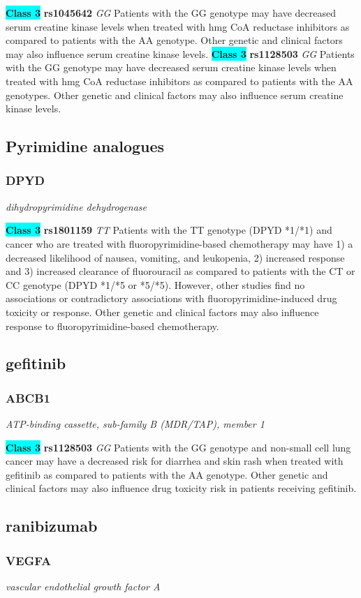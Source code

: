 \documentclass{report}
\begin{document}
\textbf{\colorbox{cyan} {Class 3}} \textbf{ rs1045642 } \textit{ GG }
Patients with the GG genotype may have decreased serum creatine kinase levels when treated with hmg CoA reductase inhibitors as compared to patients with the AA genotype. Other genetic and clinical factors may also influence serum creatine kinase levels. \newline\textbf{\colorbox{cyan} {Class 3}} \textbf{ rs1128503 } \textit{ GG }
Patients with the GG genotype may have decreased serum creatine kinase levels when treated with hmg CoA reductase inhibitors as compared to patients with the AA genotypes. Other genetic and clinical factors may also influence serum creatine kinase levels. \newline\subsection{ Pyrimidine analogues }\subsubsection{ DPYD }
\textit{ dihydropyrimidine dehydrogenase }

\textbf{\colorbox{cyan} {Class 3}} \textbf{ rs1801159 } \textit{ TT }
Patients with the TT genotype (DPYD *1/*1) and cancer who are treated with fluoropyrimidine-based chemotherapy may have 1) a decreased likelihood of nausea, vomiting, and leukopenia, 2) increased response and 3) increased clearance of fluorouracil as compared to patients with the CT or CC genotype (DPYD *1/*5 or *5/*5). However, other studies find no associations or contradictory associations with fluoropyrimidine-induced drug toxicity or response. Other genetic and clinical factors may also influence response to fluoropyrimidine-based chemotherapy.\newline\subsection{ gefitinib }\subsubsection{ ABCB1 }
\textit{ ATP-binding cassette, sub-family B (MDR/TAP), member 1 }

\textbf{\colorbox{cyan} {Class 3}} \textbf{ rs1128503 } \textit{ GG }
Patients with the GG genotype and non-small cell lung cancer may have a decreased risk for diarrhea and skin rash when treated with gefitinib as compared to patients with the AA genotype. Other genetic and clinical factors may also influence drug toxicity risk in patients receiving gefitinib.\newline\subsection{ ranibizumab }\subsubsection{ VEGFA }
\textit{ vascular endothelial growth factor A }
\end{document}
